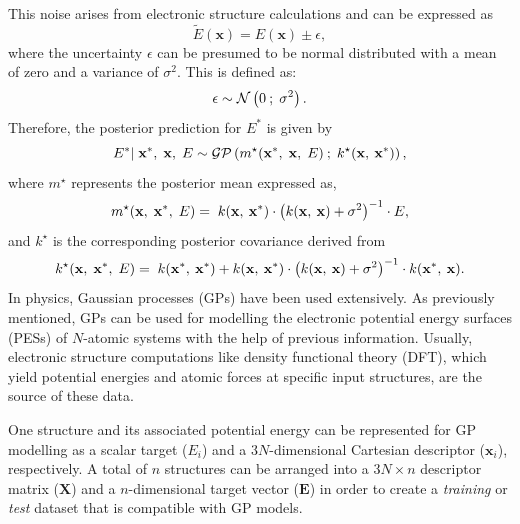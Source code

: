 This noise arises from electronic structure calculations and can be expressed as \[\tilde{E}(\mathbf{x})=E(\mathbf{x})\pm \epsilon,\] where the uncertainty $\epsilon$ can be presumed to be normal distributed with a mean of zero and a variance of $\sigma^{2}$.
This is defined as:
\begin{equation}
    \label{equ:2.34}
        \epsilon\\
        \;\mathtt{\sim}\;
        \mathcal{N}\left(0\:
         ;\; \sigma^{2}\\
             \right).
\end{equation}
Therefore, the posterior prediction for $E^{*}$ is given by
\begin{equation}
    \label{equ:2.35}
        E^{*}|\;\mathbf{x}^{*},\;\mathbf{x},\;E\\
        \;\mathtt{\sim}\;
        \mathcal{GP}\left(
        m^{\star}(\mathbf{x}^{*},\;\mathbf{x},\;E)\:
         ;\; k^{\star}(\mathbf{x},\:\mathbf{x}^{*})\\
             \right),
\end{equation}
where $m^{\star}$ represents the posterior mean expressed as,
\begin{equation}
    \label{equ:2.36}
        m^{\star}(\mathbf{x},\;\mathbf{x}^{*},\;E)\:\\
         = \; k(\mathbf{x},\:\mathbf{x}^{*})\cdot\left(k(\mathbf{x},\:\mathbf{x})+\sigma^{2}\right)^{-1}\cdot E,
\end{equation}
and $k^{\star}$ is the corresponding posterior covariance derived from
\begin{equation}
    \label{equ:2.37}
        k^{\star}(\mathbf{x},\;\mathbf{x}^{*},\;E)\:\\
         = \; k(\mathbf{x}^{*},\:\mathbf{x}^{*}) + k(\mathbf{x},\:\mathbf{x}^{*})\cdot\left(k(\mathbf{x},\:\mathbf{x})+\sigma^{2}\right)^{-1}\cdot k(\mathbf{x}^{*},\:\mathbf{x}).
\end{equation}
In physics, Gaussian processes (GPs) have been used extensively.
As previously mentioned, GPs can be used for modelling the electronic potential energy surfaces (PESs) of \(N\)-atomic systems with the help of previous information.
Usually, electronic structure computations like density functional theory (DFT), which yield potential energies and atomic forces at specific input structures, are the source of these data.

One structure and its associated potential energy can be represented for GP modelling as a scalar target (\(E_{i}\)) and a \(3N\)-dimensional Cartesian descriptor (\(\mathbf{x}_{i}\)), respectively.
A total of \(n\) structures can be arranged into a \(3N \times n\) descriptor matrix (\(\mathbf{X}\)) and a \(n\)-dimensional target vector (\(\mathbf{E}\)) in order to create a \textit{training} or \textit{test} dataset that is compatible with GP models.

